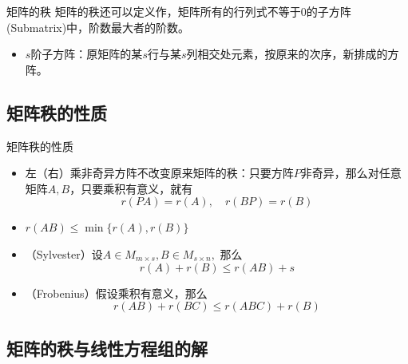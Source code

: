 
\begin{frame}

\begin{block}{矩阵的秩}
矩阵的秩还可以定义作，矩阵所有的行列式不等于$0$的子方阵(Submatrix)中，阶数最大者的阶数。

\vspace{2em}
\pause

\begin{itemize}
\item $s$阶子方阵：原矩阵的某$s$行与某$s$列相交处元素，按原来的次序，新排成的方阵。
\end{itemize}
\end{block}

\end{frame}


\subsection{矩阵秩的性质}


\begin{frame}

\begin{block}{矩阵秩的性质}
\begin{itemize}
\item 左（右）乘非奇异方阵不改变原来矩阵的秩：只要方阵$P$非奇异，那么对任意矩阵$A,B$，只要乘积有意义，就有
$$r(PA) = r(A), \quad r(BP) = r(B)$$
\item $r(AB) \leqslant \min\{ r(A), r(B) \}$
\pause
\item （Sylvester）设$A \in M_{m\times s}, B \in M_{s\times n},$ 那么
$$r(A) + r(B) \leqslant r(AB) + s$$
\item （Frobenius）假设乘积有意义，那么
$$r(AB) + r(BC) \leqslant r(ABC) + r(B)$$
\end{itemize}
\end{block}

\end{frame}


\subsection{矩阵的秩与线性方程组的解}

